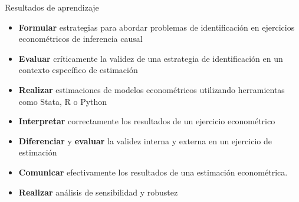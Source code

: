 \documentclass[10pt, xcolor=dvipsnames]{beamer}
\begin{document}
\begin{frame}{Resultados de aprendizaje}
\begin{itemize}\setlength{\itemsep}{0.5em}
    \item[1.] \textbf{Formular} estrategias para abordar problemas de identificación en ejercicios econométricos de inferencia causal  %
    \item[2.] \textbf{Evaluar} críticamente la validez de una estrategia de identificación en un contexto específico de estimación %
    \item[3.] \textbf{Realizar} estimaciones de modelos econométricos utilizando herramientas como Stata, R o Python %
    \item[4.] \textbf{Interpretar} correctamente los resultados de un ejercicio econométrico %
     \item[5.] \textbf{Diferenciar} y \textbf{evaluar} la validez interna y externa en un ejercicio de estimación %
    \item[6.] \textbf{Comunicar} efectivamente los resultados de una estimación econométrica. %
    \item[7.] \textbf{Realizar} análisis de sensibilidad y robustez
\end{itemize}
\end{frame}

\end{document}

